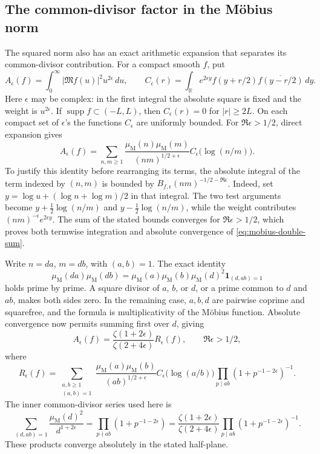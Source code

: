 \subsection{The common-divisor factor in the M\"obius norm}
\label{sec:mobius-gcd}

The squared norm also has an exact arithmetic expansion that separates
its common-divisor contribution. For a compact smooth \(f\), put
\[
 A_\epsilon(f)=\int_0^\infty
          |\mathfrak M f(u)|^2u^{2\epsilon}\,du,
 \qquad
 C_\epsilon(r)=\int_{\mathbb R}e^{2\epsilon y}
       f(y+r/2)\overline{f(y-r/2)}\,dy.
\]
Here \(\epsilon\) may be complex: in the first integral the absolute
square is fixed and the weight is \(u^{2\epsilon}\). If
\(\operatorname{supp}f\subset(-L,L)\), then
\(C_\epsilon(r)=0\) for \(|r|\ge2L\). On each compact set of
\(\epsilon\)'s the functions \(C_\epsilon\) are uniformly bounded.
For \(\Re\epsilon>1/2\), direct expansion gives
\begin{equation}\label{eq:mobius-double-sum}
 A_\epsilon(f)=\sum_{n,m\ge1}
  \frac{\mu_{\mathrm M}(n)\mu_{\mathrm M}(m)}
       {(nm)^{1/2+\epsilon}}
       C_\epsilon\bigl(\log(n/m)\bigr).
\end{equation}
To justify this identity before rearranging its terms, the absolute
integral of the term indexed by \((n,m)\) is bounded by
\(B_{f,\epsilon}(nm)^{-1/2-\Re\epsilon}\).
Indeed, set \(y=\log u+(\log n+\log m)/2\) in that integral.
The two test arguments become \(y+\tfrac12\log(n/m)\) and
\(y-\tfrac12\log(n/m)\), while the weight contributes
\((nm)^{-\epsilon}e^{2\epsilon y}\).
The sum of the stated bounds converges for \(\Re\epsilon>1/2\),
which proves both termwise integration and absolute convergence of
\eqref{eq:mobius-double-sum}.

Write \(n=da\), \(m=db\), with \((a,b)=1\). The exact identity
\[
 \mu_{\mathrm M}(da)\mu_{\mathrm M}(db)
 =\mu_{\mathrm M}(a)\mu_{\mathrm M}(b)\mu_{\mathrm M}(d)^2
           \mathbf1_{(d,ab)=1}
\]
holds prime by prime. A square divisor of \(a\), \(b\), or \(d\),
or a prime common to \(d\) and \(ab\), makes both sides zero.
In the remaining case, \(a,b,d\) are pairwise coprime and squarefree,
and the formula is multiplicativity of the M\"obius function.
Absolute convergence now permits summing first over \(d\), giving
\begin{equation}\label{eq:mobius-gcd-factor}
 A_\epsilon(f)=
 \frac{\zeta(1+2\epsilon)}{\zeta(2+4\epsilon)}R_\epsilon(f),
 \qquad \Re\epsilon>1/2,
\end{equation}
where
\begin{equation}\label{eq:mobius-coprime-series}
 R_\epsilon(f)=
 \sum_{\substack{a,b\ge1\\(a,b)=1}}
 \frac{\mu_{\mathrm M}(a)\mu_{\mathrm M}(b)}
      {(ab)^{1/2+\epsilon}}
 C_\epsilon\bigl(\log(a/b)\bigr)
 \prod_{p\mid ab}(1+p^{-1-2\epsilon})^{-1}.
\end{equation}
The inner common-divisor series used here is
\[
 \sum_{(d,ab)=1}\frac{\mu_{\mathrm M}(d)^2}{d^{1+2\epsilon}}
 =\prod_{p\nmid ab}(1+p^{-1-2\epsilon})
 =\frac{\zeta(1+2\epsilon)}{\zeta(2+4\epsilon)}
       \prod_{p\mid ab}(1+p^{-1-2\epsilon})^{-1}.
\]
These products converge absolutely in the stated half-plane.

